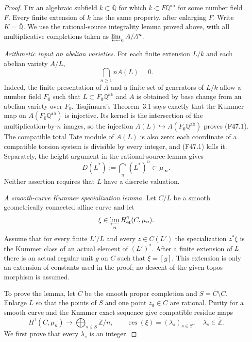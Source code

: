 \begin{proof}
Fix an algebraic subfield $k\subset\overline{\mathbb Q}$ for which
$k\subset F\mathbb Q^{\mathrm{ab}}$ for some number field $F$.
Every finite extension of $k$ has the same property, after enlarging
$F$. Write $K=\overline{\mathbb Q}$. We use the rational-source
integrality lemma proved above, with all multiplicative completions
taken as $\varprojlim_n A/A^n$.

\emph{Arithmetic input on abelian varieties.}
For each finite extension $L/k$ and each abelian variety $A/L$,
\[
 \bigcap_{n\geq1} nA(L)=0.                                  \tag{F47.1}
\]
Indeed, the finite presentation of $A$ and a finite set of generators
of $L/k$ allow a number field $F_0$ such that
$L\subset F_0\mathbb Q^{\mathrm{ab}}$ and $A$ is obtained by base
change from an abelian variety over $F_0$. Tsujimura's
Theorem~3.1 \cite{Tsujimura2020} says exactly that the Kummer map
on $A(F_0\mathbb Q^{\mathrm{ab}})$ is injective. Its kernel is the
intersection of the multiplication-by-$n$ images, so the injection
$A(L)\hookrightarrow A(F_0\mathbb Q^{\mathrm{ab}})$ proves
(F47.1). The compatible total Tate module of $A(L)$ is also zero:
each coordinate of a compatible torsion system is divisible by every
integer, and (F47.1) kills it. Separately, the height argument in the
rational-source lemma gives
\[
 D(L^*):=\bigcap_n(L^*)^n\subset\mu_\infty.                  \tag{F47.2}
\]
Neither assertion requires that $L$ have a discrete valuation.

\emph{A smooth-curve Kummer specialization lemma.}
Let $C/L$ be a smooth geometrically connected affine curve and let
\[
 \xi\in\varprojlim_n H^1_{\mathrm{et}}(C,\mu_n).
\]
Assume that for every finite $L'/L$ and every $z\in C(L')$ the
specialization $z^*\xi$ is the Kummer class of an actual element of
$(L')^*$. After a finite extension of $L$ there is an actual regular
unit $g$ on $C$ such that $\xi=[g]$. This extension is only an
extension of constants used in the proof; no descent of the given
topos morphism is assumed.

To prove the lemma, let $\overline C$ be the smooth proper completion
and $S=\overline C\setminus C$. Enlarge $L$ so that the points of
$S$ and one point $z_0\in C$ are rational. Purity for a smooth curve
and the Kummer exact sequence give compatible residue maps
\[
 H^1(C,\mu_n)\longrightarrow
       \bigoplus_{s\in S}\mathbb Z/n,
 \qquad
 \operatorname{res}(\xi)=(\lambda_s)_{s\in S},
 \quad\lambda_s\in\widehat{\mathbb Z}.                    \tag{F47.3}
\]
We first prove that every $\lambda_s$ is an integer.


\end{proof}
